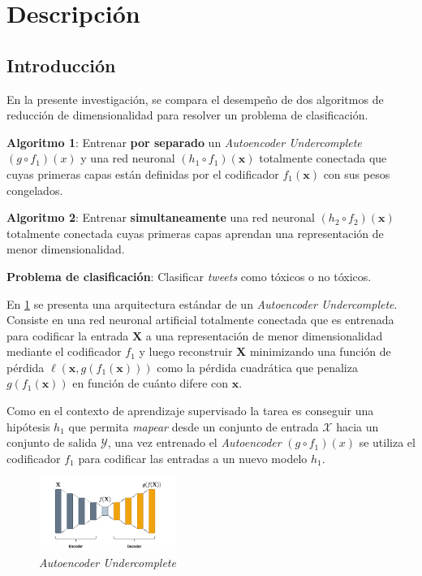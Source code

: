 \section{Descripción}

\subsection{Introducción}

En la presente investigación, se compara el desempeño de dos algoritmos de reducción de dimensionalidad para resolver un problema de clasificación.

\textbf{Algoritmo 1}: Entrenar \textbf{por separado} un \textit{Autoencoder Undercomplete} $(g \circ f_1)(x)$ y una red neuronal $(h_1 \circ f_1)(\bm{x})$ totalmente conectada que cuyas primeras capas están definidas por el codificador $f_1(\bm{x})$ con sus pesos congelados.

\textbf{Algoritmo 2}: Entrenar \textbf{simultaneamente} una red neuronal $(h_2 \circ f_2)(\bm{x})$ totalmente conectada cuyas primeras capas aprendan una representación de menor dimensionalidad.

\textbf{Problema de clasificación}: Clasificar \textit{tweets} como tóxicos o no tóxicos.

En \ref{fig:autoencoder} se presenta una arquitectura estándar de un \textit{Autoencoder Undercomplete}. Consiste en una red neuronal artificial totalmente conectada que es entrenada para codificar la entrada $\mathbf{X}$ a una representación de menor dimensionalidad mediante el codificador $f_1$ y luego reconstruir $\mathbf{X}$ minimizando una función de pérdida $\ell(\bm{x},g(f_1(\bm{x})))$ como la pérdida cuadrática que penaliza $g(f_1(\bm{x}))$ en función de cuánto difere con $\bm{x}$.

Como en el contexto de aprendizaje supervisado la tarea es conseguir una hipótesis $h_1$ que permita \textit{mapear} desde un conjunto de entrada $\mathcal{X}$ hacia un conjunto de salida $\mathcal{Y}$, una vez entrenado el \textit{Autoencoder} $(g \circ f_1)(x)$ se utiliza el codificador $f_1$ para codificar las entradas a un nuevo modelo $h_{1}$. 

\begin{figure}[h] %
\centering
\includegraphics[width=0.4\textwidth]{autoencoder}
\caption{\label{fig:autoencoder} \textit{Autoencoder Undercomplete}}
\end{figure}



